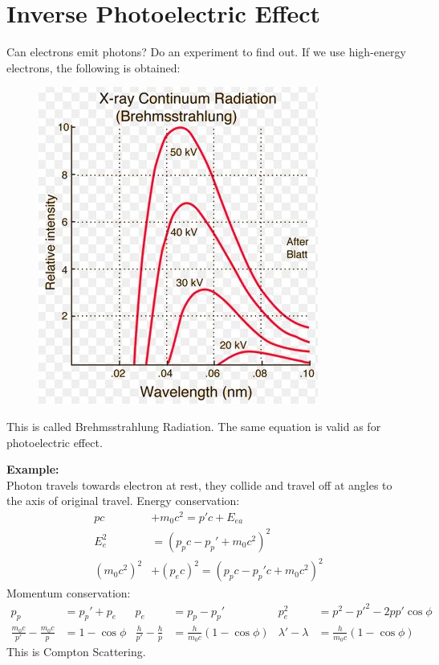 \documentclass[a4paper, 11pt, normalem]{report}
\begin{document}
\section{Inverse Photoelectric Effect}
Can electrons emit photons? Do an experiment to find out.
If we use high-energy electrons, the following is obtained:
\begin{figure}[H]
    \centering
    \includegraphics{Bremstrah.jpg}
\end{figure}
This is called Brehmsstrahlung Radiation.
The same equation is valid as for photoelectric effect.

\textbf{Example:}\\
Photon travels towards electron at rest, they collide and travel off at angles to the axis of original travel.
Energy conservation:
\begin{align}
    pc &+ m_{0}c^{2} = p'c + E_{ea} \\
    E_{e}^{2} &= (p_{p}c - p_{p}' + m_{0}c^{2})^{2} \\
    (m_{0}c^{2})^{2} &+ (p_{e}c)^{2} = (p_{p}c - p_{p}'c + m_{0}c^{2})^{2}
\end{align}
Momentum conservation:
\begin{align}
    p_{p} &= p_{p}' + p_{e} & p_{e} &= p_{p} - p_{p}' & p_{e}^{2} &= p^{2} - p'^{2} - 2pp'\cos{\phi} \\
    \frac{m_{0}c}{p'} - \frac{m_{0}c}{p} &= 1 - \cos{\phi} & \frac{h}{p'} - \frac{h}{p} &= \frac{h}{m_{0}c}(1 - \cos{\phi}) & \lambda' - \lambda &= \frac{h}{m_{0}c}(1 - \cos{\phi})
\end{align}
This is Compton Scattering.
\end{document}
